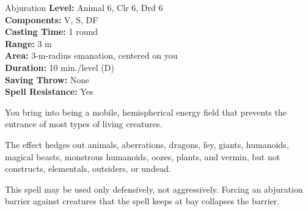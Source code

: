 {Abjuration}
{
	\textbf{Level:}
	Animal 6, Clr 6, Drd 6\\
	\textbf{Components:}
	V, S, DF\\
	\textbf{Casting Time:}
	1 round\\
	\textbf{Range:}
	3 m\\
	\textbf{Area:}
	3-m-radius emanation, centered on you\\
	\textbf{Duration:}
	10 min./level (D)\\
	\textbf{Saving Throw:}
	None\\
	\textbf{Spell Resistance:}
	Yes\\
}
{
	You bring into being a mobile, hemispherical energy field that prevents the entrance of most types of living creatures.

	The effect hedges out animals, aberrations, dragons, fey, giants, humanoids, magical beasts, monstrous humanoids, oozes, plants, and vermin, but not constructs, elementals, outsiders, or undead.

	This spell may be used only defensively, not aggressively. Forcing an abjuration barrier against creatures that the spell keeps at bay collapses the barrier.

}
